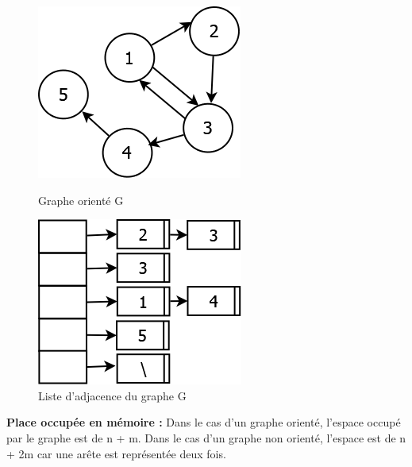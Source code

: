 \begin{figure}[H]
	\begin{minipage}[c]{.46\linewidth}
	\begin{center}
		\includegraphics[height=100 pt, width=110 pt]{./ressources/image/graphAdjace.png} 
		\caption{Graphe orienté G}
		\label{grapAdjac2}
	\end{center}
	\end{minipage} 
	\begin{minipage}[c]{.46\linewidth}
	\begin{center}
		\includegraphics[height=110 pt, width=140 pt]{./ressources/image/listeAdjace.png} 
		\caption{Liste d'adjacence du graphe G}
		\label{listeAdjac}
	\end{center}
	\end{minipage} 
\end{figure}


\textbf{Place occupée en mémoire :} Dans le cas d'un graphe orienté, l'espace occupé par le graphe est de n + m. Dans le cas d'un graphe non orienté, l'espace est de n + 2m car une arête est représentée deux fois.